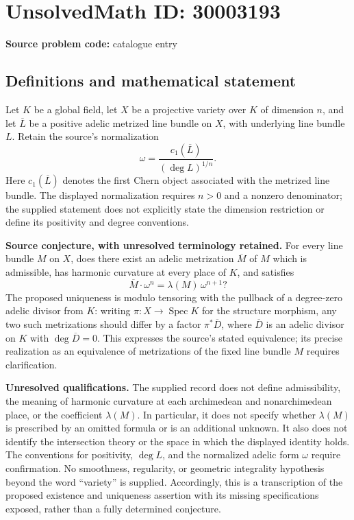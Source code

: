 \documentclass[11pt]{article}
\begin{document}
\section*{UnsolvedMath ID: 30003193}
\textbf{Source problem code:} catalogue entry
\subsection{Definitions and mathematical statement}
Let \(K\) be a global field, let \(X\) be a projective variety over \(K\) of dimension \(n\), and let \(\overline L\) be a positive adelic metrized line bundle on \(X\), with underlying line bundle \(L\). Retain the source's normalization
\[
\omega=\frac{c_1(\overline L)}{(\deg L)^{1/n}}.
\]
Here \(c_1(\overline L)\) denotes the first Chern object associated with the metrized line bundle. The displayed normalization requires \(n>0\) and a nonzero denominator; the supplied statement does not explicitly state the dimension restriction or define its positivity and degree conventions.

\textbf{Source conjecture, with unresolved terminology retained.} For every line bundle \(M\) on \(X\), does there exist an adelic metrization \(\overline M\) of \(M\) which is admissible, has harmonic curvature at every place of \(K\), and satisfies
\[
\overline M\cdot\omega^n=\lambda(M)\,\omega^{n+1}?
\]
The proposed uniqueness is modulo tensoring with the pullback of a degree-zero adelic divisor from \(K\): writing \(\pi:X\to\operatorname{Spec}K\) for the structure morphism, any two such metrizations should differ by a factor \(\pi^*\overline D\), where \(\overline D\) is an adelic divisor on \(K\) with \(\deg\overline D=0\). This expresses the source's stated equivalence; its precise realization as an equivalence of metrizations of the fixed line bundle \(M\) requires clarification.

\textbf{Unresolved qualifications.} The supplied record does not define admissibility, the meaning of harmonic curvature at each archimedean and nonarchimedean place, or the coefficient \(\lambda(M)\). In particular, it does not specify whether \(\lambda(M)\) is prescribed by an omitted formula or is an additional unknown. It also does not identify the intersection theory or the space in which the displayed identity holds. The conventions for positivity, \(\deg L\), and the normalized adelic form \(\omega\) require confirmation. No smoothness, regularity, or geometric integrality hypothesis beyond the word ``variety'' is supplied. Accordingly, this is a transcription of the proposed existence and uniqueness assertion with its missing specifications exposed, rather than a fully determined conjecture.
\end{document}
